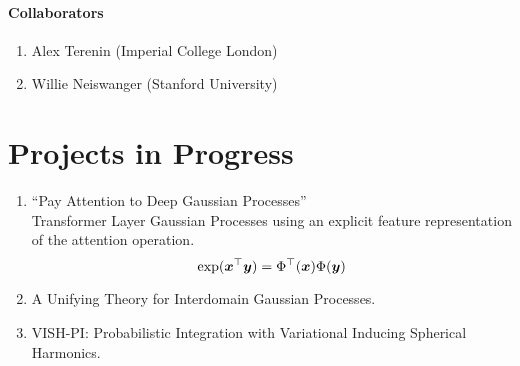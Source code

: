 
\paragraph{Collaborators}
\begin{enumerate}
    \item Alex Terenin (Imperial College London)
    \item Willie Neiswanger (Stanford University)
\end{enumerate}


\section{Projects in Progress}
\begin{enumerate}
    \item ``Pay Attention to Deep Gaussian Processes''\\
    Transformer Layer Gaussian Processes using an explicit feature representation of the attention operation.
    \begin{equation*}
        \exp(\bm{x}^\top \bm{y}) = \Phi^\top(\bm{x}) \Phi(\bm{y})
    \end{equation*}
    \item A Unifying Theory for Interdomain Gaussian Processes.
    \item VISH-PI: Probabilistic Integration with Variational Inducing Spherical Harmonics.
\end{enumerate}



